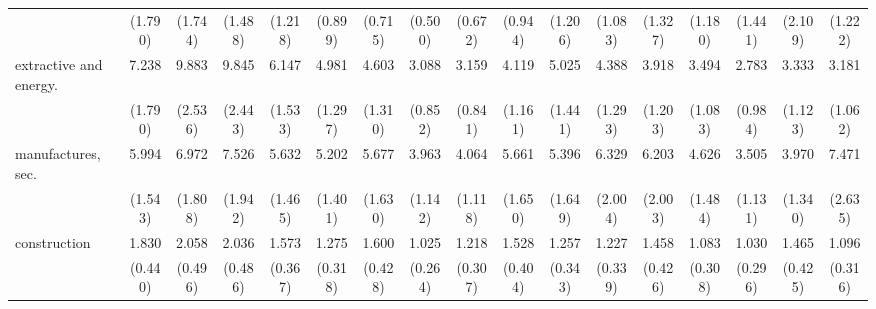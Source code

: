 {\begin{tabular}{l*{16}{c}}
                    &     (1.790)         &     (1.744)         &     (1.488)         &     (1.218)         &     (0.899)         &     (0.715)         &     (0.500)         &     (0.672)         &     (0.944)         &     (1.206)         &     (1.083)         &     (1.327)         &     (1.180)         &     (1.441)         &     (2.109)         &     (1.222)         \\
[1em]
extractive and energy.&       7.238\sym{***}&       9.883\sym{***}&       9.845\sym{***}&       6.147\sym{***}&       4.981\sym{***}&       4.603\sym{***}&       3.088\sym{***}&       3.159\sym{***}&       4.119\sym{***}&       5.025\sym{***}&       4.388\sym{***}&       3.918\sym{***}&       3.494\sym{***}&       2.783\sym{**} &       3.333\sym{***}&       3.181\sym{***}\\
                    &     (1.790)         &     (2.536)         &     (2.443)         &     (1.533)         &     (1.297)         &     (1.310)         &     (0.852)         &     (0.841)         &     (1.161)         &     (1.441)         &     (1.293)         &     (1.203)         &     (1.083)         &     (0.984)         &     (1.123)         &     (1.062)         \\
[1em]
manufactures, sec.  &       5.994\sym{***}&       6.972\sym{***}&       7.526\sym{***}&       5.632\sym{***}&       5.202\sym{***}&       5.677\sym{***}&       3.963\sym{***}&       4.064\sym{***}&       5.661\sym{***}&       5.396\sym{***}&       6.329\sym{***}&       6.203\sym{***}&       4.626\sym{***}&       3.505\sym{***}&       3.970\sym{***}&       7.471\sym{***}\\
                    &     (1.543)         &     (1.808)         &     (1.942)         &     (1.465)         &     (1.401)         &     (1.630)         &     (1.142)         &     (1.118)         &     (1.650)         &     (1.649)         &     (2.004)         &     (2.003)         &     (1.484)         &     (1.131)         &     (1.340)         &     (2.635)         \\
[1em]
construction        &       1.830\sym{*}  &       2.058\sym{**} &       2.036\sym{**} &       1.573         &       1.275         &       1.600         &       1.025         &       1.218         &       1.528         &       1.257         &       1.227         &       1.458         &       1.083         &       1.030         &       1.465         &       1.096         \\
                    &     (0.440)         &     (0.496)         &     (0.486)         &     (0.367)         &     (0.318)         &     (0.428)         &     (0.264)         &     (0.307)         &     (0.404)         &     (0.343)         &     (0.339)         &     (0.426)         &     (0.308)         &     (0.296)         &     (0.425)         &     (0.316)         \\

\end{tabular}}
